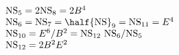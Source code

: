 \begin{equation}
  \begin{array}{l}
{\rm NS}_5 = 2 {\rm NS}_8 = 2 B^4 \\
{\rm NS}_6 ={\rm NS}_7 = \half {\rm NS}_9 ={\rm NS}_{11} = E^4 \\
{\rm NS}_{10} = E^6/B^2 = {\rm NS}_{12} ~{\rm NS}_6 / {\rm NS}_5 \\
{\rm NS}_{12} = 2 B^2 E^2 
  \end{array}
\end{equation}

